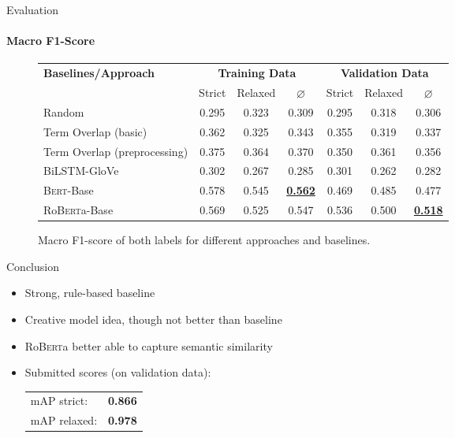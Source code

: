 \documentclass[english,handout]{mlutalk}
\newcommand{\BiLSTM}{\mbox{BiLSTM}\xspace}
\newcommand{\Bert}{\textsc{Bert}\xspace}
\newcommand{\BertBase}{\Bert-Base\xspace}
\newcommand{\Roberta}{\mbox{Ro\textsc{Bert}a}\xspace}
\newcommand{\RobertaBase}{\Roberta-Base\xspace}
\renewcommand{\lg}{\color{lightgray}}
\begin{document}
\begin{frame}{Evaluation}
  \framesubtitle{Macro F1-Score}
  \begin{figure}
    \centering
    \caption{Macro F1-score of both labels for different approaches and baselines.}
    \scriptsize
    \begin{tabular}{lcccccc}
      \toprule
      \textbf{Baselines/Approach} & \multicolumn{3}{c}{\textbf{Training Data}} & \multicolumn{3}{c}{\textbf{Validation Data}} \\
      \cmidrule(r{0.5em}){2-4} \cmidrule(l{0.5em}){5-7}
      & Strict & Relaxed & \(\varnothing\) & Strict & Relaxed & \(\varnothing\) \\
      \midrule
      Random 
      & 0.295 & 0.323 & 0.309 & 0.295 & 0.318 & 0.306 \\
      Term Overlap (basic)
      & 0.362 & 0.325 & 0.343 & 0.355 & 0.319 & 0.337 \\
      Term Overlap (preprocessing)
      & 0.375 & 0.364 & 0.370 & 0.350 & 0.361 & 0.356 \\
      \midrule
      \lg\BiLSTM-GloVe
      & \lg0.302 & \lg0.267 & \lg0.285 & \lg0.301 & \lg0.262 & \lg0.282 \\
      \BertBase
      & 0.578 & 0.545 & \textbf{\underline{0.562}} & 0.469 & 0.485 & 0.477 \\
      \RobertaBase
      & 0.569 & 0.525 & 0.547 & 0.536 & 0.500 & \textbf{\underline{0.518}} \\
      \bottomrule
    \end{tabular}
  \end{figure}
\end{frame}

\begin{frame}{Conclusion}
  \begin{itemize}
    \item Strong, rule-based baseline
    \item Creative model idea, though not better than baseline
    \item \Roberta better able to capture semantic similarity
    \item Submitted scores (on validation data): \\
    \begin{tabular}{@{}lc}
      mAP strict: & \textbf{0.866} \\
      mAP relaxed: & \textbf{0.978}
    \end{tabular}
  \end{itemize}
\end{frame}

\appendix
\section{\appendixname}

\bibliographyframe
\end{document}
